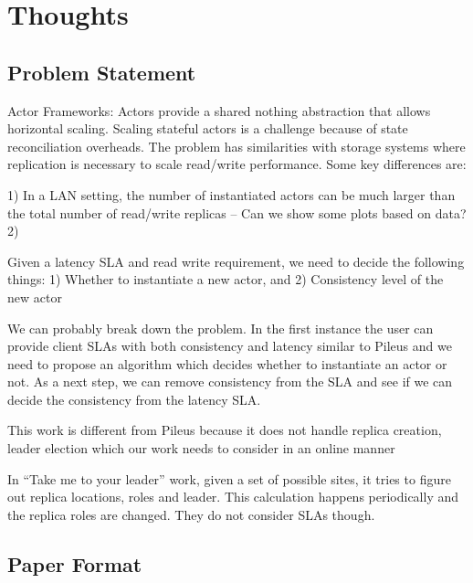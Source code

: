 \section{Thoughts}
\label{sec:intro}

\subsection{Problem Statement}

Actor Frameworks: Actors provide a shared nothing abstraction that allows horizontal scaling. Scaling stateful actors is a challenge because of state reconciliation overheads. The problem has similarities with storage systems where replication is necessary to scale read/write performance. Some key differences are:


1) In a LAN setting, the number of instantiated actors can be much larger than the total number of read/write replicas -- Can we show some plots based on data?
2) 


Given a latency SLA and read write requirement, we need to decide the following things: 1) Whether to instantiate a new actor, and 2) Consistency level of the new actor

We can probably break down the problem. In the first instance the user can provide client SLAs with both consistency and latency similar to Pileus and we need to propose an algorithm which decides whether to instantiate an actor or not. As a next step, we can remove consistency from the SLA and see if we can decide the consistency from the latency SLA.

This work is different from Pileus because it does not handle replica creation, leader election which our work needs to consider in an online manner

In ``Take me to your leader'' work, given a set of possible sites, it tries to figure out replica locations, roles and leader. This calculation happens periodically and the replica roles are changed. They do not consider SLAs though.

\subsection{Paper Format}
